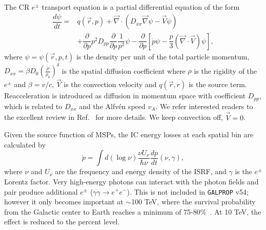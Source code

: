 \documentclass[doublespace,nopageskip]{VTthesis} %
\begin{document}
The CR $e^\pm$ transport equation is a partial differential equation of the form
\begin{align}
  \label{eq:prop_eq}
  \dfrac{d\psi}{dt} = &q(\vec{r},p)+\vec{\nabla}\cdot(D_{xx}\vec{\nabla}\psi-\vec{V}\psi)\nonumber\\
                       &+\dfrac{\partial}{\partial p}p^2D_{pp}\dfrac{\partial}{\partial p}\dfrac{1}{p^2}\psi-\dfrac{\partial}{\partial p}[\dot{p}\psi-\dfrac{p}{3}(\vec{\nabla}\cdot\vec{V})\psi],
\end{align}
where $\psi = \psi(\vec{r},p,t)$ is the density per unit of the total particle momentum, $D_{xx} = \beta D_0 (\frac{\rho}{\rho_0})^\delta$ is the spatial diffusion coefficient where $\rho$ is the rigidity of the $e^\pm$ and $\beta = v/c$, $\vec{V}$ is the convection velocity and $q(\vec{r},r)$ is the source term. Reacceleration is introduced as diffusion in momentum space with coefficient $D_{pp}$, which is related to $D_{xx}$ and the Alfv\'{e}n speed $v_A$. We refer interested readers to the excellent review in Ref.~\cite{Strong:2007nh} for more details. We keep convection off, $\vec{V}=0$.

Given the source function of MSPs, the IC energy losses at each spatial bin are calculated by
\begin{equation}
  \dot{p} = \int d(\log{\nu})\dfrac{\nu U_\nu}{\hbar \nu}\dfrac{dp}{dt}(\nu,\gamma),
\end{equation}
where $\nu$ and $U_\nu$ are the frequency and energy density of the ISRF, and $\gamma$ is the $e^\pm$ Lorentz factor. Very high-energy photons can interact with the photon fields and pair produce additional $e^\pm$ ($\gamma\gamma \to e^+e^-$). This is not included in \texttt{GALPROP} v54; however it only becomes important at $\sim$100 TeV, where the survival probability from the Galactic center to Earth reaches a minimum of 75-80\%~\cite{Moskalenko:2005ng}. At 10 TeV, the effect is reduced to the percent level.
\end{document}
